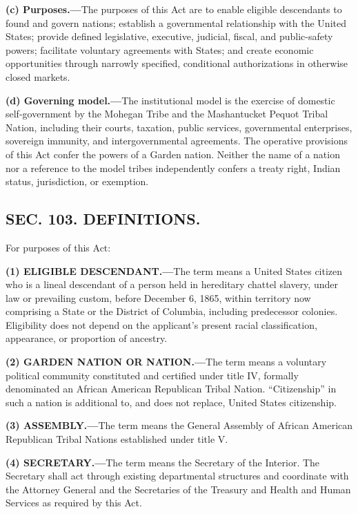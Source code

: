 \documentclass[12pt,letterpaper]{article}
\begin{document}
\textbf{(c) Purposes.---}The purposes of this Act are to enable eligible descendants to found and govern nations; establish a governmental relationship with the United States; provide defined legislative, executive, judicial, fiscal, and public-safety powers; facilitate voluntary agreements with States; and create economic opportunities through narrowly specified, conditional authorizations in otherwise closed markets.

\textbf{(d) Governing model.---}The institutional model is the exercise of domestic self-government by the Mohegan Tribe and the Mashantucket Pequot Tribal Nation, including their courts, taxation, public services, governmental enterprises, sovereign immunity, and intergovernmental agreements. The operative provisions of this Act confer the powers of a Garden nation. Neither the name of a nation nor a reference to the model tribes independently confers a treaty right, Indian status, jurisdiction, or exemption.

\subsection*{SEC. 103. DEFINITIONS.}

For purposes of this Act:

\textbf{(1) ELIGIBLE DESCENDANT.---}The term means a United States citizen who is a lineal descendant of a person held in hereditary chattel slavery, under law or prevailing custom, before December 6, 1865, within territory now comprising a State or the District of Columbia, including predecessor colonies. Eligibility does not depend on the applicant's present racial classification, appearance, or proportion of ancestry.

\textbf{(2) GARDEN NATION OR NATION.---}The term means a voluntary political community constituted and certified under title IV, formally denominated an African American Republican Tribal Nation. ``Citizenship'' in such a nation is additional to, and does not replace, United States citizenship.

\textbf{(3) ASSEMBLY.---}The term means the General Assembly of African American Republican Tribal Nations established under title V.

\textbf{(4) SECRETARY.---}The term means the Secretary of the Interior. The Secretary shall act through existing departmental structures and coordinate with the Attorney General and the Secretaries of the Treasury and Health and Human Services as required by this Act.
\end{document}
